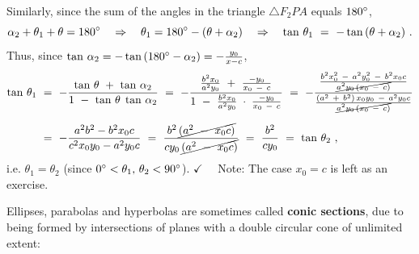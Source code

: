 Similarly, since the sum of the angles in the triangle
$\triangle F_2PA$ equals $180^\circ$,
\[
\alpha_2 + \theta_1 + \theta = 180^\circ \quad\Rightarrow\quad
\theta_1 = 180^\circ - (\theta + \alpha_2) \quad\Rightarrow\quad
\tan\,\theta_1 ~=~ -\tan\,(\theta + \alpha_2) ~.
\]
\newpage
\noindent Thus, since $\tan\,\alpha_2 = -\tan\,(180^\circ - \alpha_2) =
-\frac{y_0}{x-c}$,
\begin{align*}
\tan\,\theta_1 ~&=~ -\frac{\tan\,\theta ~+~ \tan\,\alpha_2}{1 ~-~ \tan\,\theta\;\tan\,\alpha_2} ~=~
 -\frac{\frac{b^2x_0}{a^2y_0} ~+~ \frac{-y_0}{x_0 ~-~ c}}{1 ~-~
 \frac{b^2x_0}{a^2y_0}\;\cdot\;\frac{-y_0}{x_0 ~-~ c}} ~=~
 -\frac{\frac{b^2 x_0^2 ~-~ a^2 y_0^2 ~-~ b^2 x_0 c}{\cancel{a^2 y_0\,(x_0 ~-~
  c)}}}{\frac{(a^2 ~+~ b^2)\,x_0 y_0 ~-~ a^2 y_0 c}{\cancel{a^2 y_0\,(x_0 ~-~ c)}}}\\[6pt]
&=~ -\frac{a^2 b^2 - b^2 x_0 c}{c^2 x_0 y_0 - a^2 y_0 c} ~=~
  \frac{b^2 \,\cancel{(a^2 ~-~ x_0 c)}}{cy_0\,\cancel{(a^2 ~-~ x_0 c)}} ~=~ \frac{b^2}{cy_0}
~=~ \tan\,\theta_2 ~,
\end{align*}
i.e. $\theta_1 = \theta_2$
(since $0^\circ < \theta_1,\,\theta_2 < 90^\circ$). $\checkmark\quad$
Note: The case $x_0=c$ is left as an exercise.\vspace{1mm}

\divider
\vspace{2mm}

Ellipses, parabolas and hyperbolas are sometimes called
\textbf{conic sections}, due to being formed by
intersections of planes with a double circular cone of unlimited extent:

